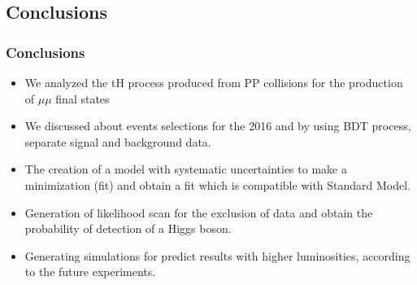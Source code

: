 \documentclass[11pt]{beamer}
\begin{document}
\begin{frame}
\section{Conclusions}
\frametitle{Conclusions}
\begin{itemize}
	\item We analyzed the tH process produced from PP collisions for the production of $\mu\mu$ final states   
	\item We discussed about events selections for the 2016 and by using BDT process, separate signal and background data. 
	\item The creation of a model with systematic uncertainties to make a minimization (fit) and obtain a fit which is compatible with Standard Model.
	\item Generation of likelihood scan for the exclusion of data and obtain the probability of detection of a Higgs boson.
	\item Generating simulations for predict results with higher luminosities, according to the future experiments.  
	
\end{itemize}
\end{frame}
\end{document}
